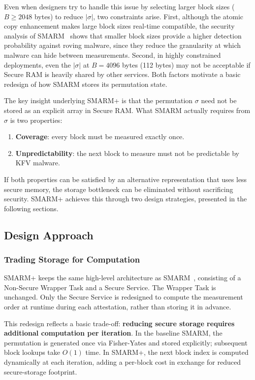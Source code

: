 \documentclass[a4paper,10pt]{article}
\begin{document}
{Even when designers try to handle this issue by selecting 
larger block sizes ($B \geq 2048$ bytes) to reduce $|\sigma|$, two 
constraints arise. First, although the atomic copy enhancement 
makes large block sizes real-time compatible, the security 
analysis of SMARM~\cite{carpent2018smarm} shows that smaller 
block sizes provide a higher detection probability against roving 
malware, since they reduce the granularity at which malware can 
hide between measurements. Second, in highly constrained 
deployments, even the $|\sigma|$ at $B = 4096$ bytes (112 bytes) 
may not be acceptable if Secure RAM is heavily shared by other 
services. Both factors motivate a basic redesign of how 
SMARM stores its permutation state.

The key insight underlying SMARM+ is that the permutation $\sigma$ 
need not be stored as an explicit array in Secure RAM. 
What SMARM actually requires from $\sigma$ is two properties:

\begin{enumerate}
    \item \textbf{Coverage}: every block must be measured exactly once.
    \item \textbf{Unpredictability}: the next block to measure must 
    not be predictable by KFV malware.
\end{enumerate}

If both properties can be satisfied by an alternative representation 
that uses less secure memory, the storage bottleneck can be 
eliminated without sacrificing security. SMARM+ achieves this 
through two design strategies, presented in the following 
sections.


\subsection{Design Approach}
\label{sec:smarmplus-design}

\subsubsection{Trading Storage for Computation}

SMARM+ keeps the same high-level architecture as 
SMARM~\cite{carpent2018smarm}, consisting of a Non-Secure Wrapper 
Task and a Secure Service. The Wrapper Task is unchanged. Only the 
Secure Service is redesigned to compute the measurement order 
at runtime during each attestation, rather than storing it 
in advance.

This redesign reflects a basic trade-off: \textbf{reducing 
secure storage requires additional computation per iteration}. In 
the baseline SMARM, the permutation is generated once via 
Fisher-Yates and stored explicitly; subsequent block lookups take 
$O(1)$ time. In SMARM+, the next block index is computed 
dynamically at each iteration, adding a per-block cost in 
exchange for reduced secure-storage footprint.

}
\end{document}
